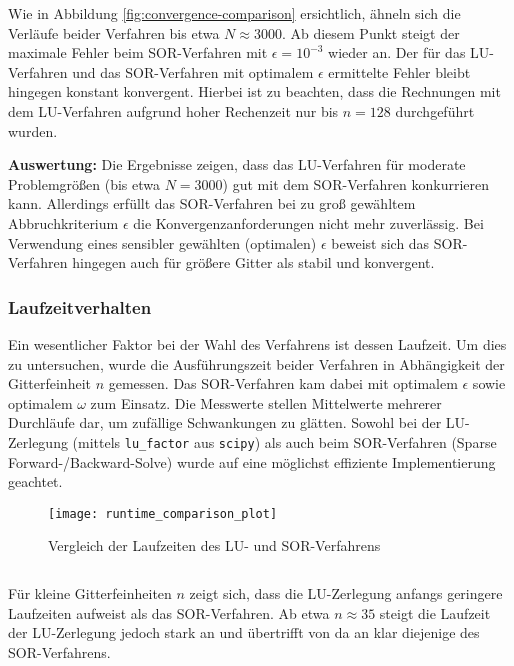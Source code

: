 \documentclass{scrartcl}
\newenvironment{code}{\captionsetup{type=listing}}{}
\begin{document}
Wie in Abbildung \ref{fig:convergence-comparison} ersichtlich, ähneln sich die
Verläufe beider Verfahren bis etwa \(N \approx 3000\). Ab diesem Punkt steigt
der maximale Fehler beim SOR-Verfahren mit \(\epsilon = 10^{-3}\) wieder an.
Der für das LU-Verfahren und das SOR-Verfahren mit optimalem \(\epsilon\)
ermittelte Fehler bleibt hingegen konstant konvergent. Hierbei ist zu beachten,
dass die Rechnungen mit dem LU-Verfahren aufgrund hoher Rechenzeit nur bis \(n
= 128\) durchgeführt wurden.

\textbf{Auswertung:}
Die Ergebnisse zeigen, dass das LU-Verfahren für moderate Problemgrößen (bis
etwa \(N = 3000\)) gut mit dem SOR-Verfahren konkurrieren kann. Allerdings
erfüllt das SOR-Verfahren bei zu groß gewähltem Abbruchkriterium \(\epsilon\)
die Konvergenzanforderungen nicht mehr zuverlässig. Bei Verwendung eines
sensibler gewählten (optimalen) \(\epsilon\) beweist sich das SOR-Verfahren
hingegen auch für größere Gitter als stabil und konvergent.

\subsubsection{Laufzeitverhalten}

Ein wesentlicher Faktor bei der Wahl des Verfahrens ist dessen Laufzeit. Um
dies zu untersuchen, wurde die Ausführungszeit beider Verfahren in Abhängigkeit
der Gitterfeinheit \(n\) gemessen. Das SOR-Verfahren kam dabei mit optimalem
\(\epsilon\) sowie optimalem \(\omega\) zum Einsatz. Die Messwerte stellen
Mittelwerte mehrerer Durchläufe dar, um zufällige Schwankungen zu glätten.
Sowohl bei der LU-Zerlegung (mittels \texttt{lu\_factor} aus \texttt{scipy})
als auch beim SOR-Verfahren (Sparse Forward-/Backward-Solve) wurde auf eine
möglichst effiziente Implementierung geachtet.

\begin{figure}[H]
    \centering
    \texttt{[image: runtime\_comparison\_plot]}
    \caption{Vergleich der Laufzeiten des LU- und SOR-Verfahrens}
    \label{fig:runtime-comparison}
\end{figure}

\begin{code}
    \label{code:runtime-comparison}
    \inputminted[firstline=38, lastline=42]{bash}{figures/generate.sh}
\end{code}

Für kleine Gitterfeinheiten \(n\) zeigt sich, dass die LU-Zerlegung anfangs
geringere Laufzeiten aufweist als das SOR-Verfahren. Ab etwa \(n \approx 35\)
steigt die Laufzeit der LU-Zerlegung jedoch stark an und übertrifft von da an
klar diejenige des SOR-Verfahrens.
\end{document}
